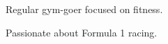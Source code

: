 \documentclass[letter,10pt]{article}
\begin{document}
\begin{zitemize}
  \item Regular gym-goer focused on fitness.
  \item Passionate about Formula 1 racing.
\end{zitemize}
\end{document}
